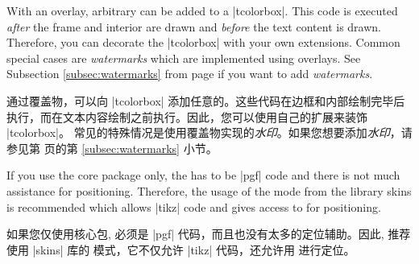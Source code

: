  With an overlay, arbitrary  can be added to a
 |tcolorbox|. This code is executed \emph{after} the frame and interior are
 drawn and \emph{before} the text content is drawn. Therefore, you can
 decorate the |tcolorbox| with your own extensions.
 Common special cases are \emph{watermarks} which are implemented using overlays.
 See Subsection \ref{subsec:watermarks} from page \pageref{subsec:watermarks} if
 you want to add \emph{watermarks}.

通过覆盖物，可以向 |tcolorbox| 添加任意的。这些代码在边框和内部绘制完毕后执行，而在文本内容绘制之前执行。因此，您可以使用自己的扩展来装饰 |tcolorbox|。
常见的特殊情况是使用覆盖物实现的\emph{水印}。如果您想要添加\emph{水印}，请参见第 \pageref{subsec:watermarks} 页的第 \ref{subsec:watermarks} 小节。


\begin{marker}
 If you use the core package only, the  has to be |pgf| code
 and there is not much assistance for positioning.
 Therefore, the usage of the  mode from the library skins
 is recommended which allows |tikz| code and gives access to
  for positioning.

如果您仅使用核心包,  必须是 |pgf| 代码，而且也没有太多的定位辅助。因此, 推荐使用 |skins| 库的  模式，它不仅允许 |tikz| 代码，还允许用  进行定位。
\end{marker}


